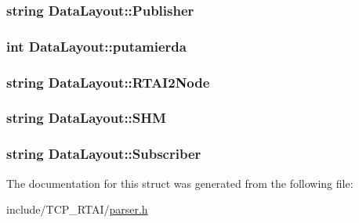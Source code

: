\label{structDataLayout_a53199b1a7dec9a22f699bb52c29ad6bf}
\hypertarget{structDataLayout_abaebb94f1869d06fb8f6ac20b6aa2a73}{
\subsubsection[{Publisher}]{\setlength{\rightskip}{0pt plus 5cm}string {\bf DataLayout::Publisher}}}
\label{structDataLayout_abaebb94f1869d06fb8f6ac20b6aa2a73}
\hypertarget{structDataLayout_aa1592c16757fab1045b59a6401cc5fc3}{
\subsubsection[{putamierda}]{\setlength{\rightskip}{0pt plus 5cm}int {\bf DataLayout::putamierda}}}
\label{structDataLayout_aa1592c16757fab1045b59a6401cc5fc3}
\hypertarget{structDataLayout_a7c8d32e6ccc22a6555aacd42c5d2038d}{
\subsubsection[{RTAI2Node}]{\setlength{\rightskip}{0pt plus 5cm}string {\bf DataLayout::RTAI2Node}}}
\label{structDataLayout_a7c8d32e6ccc22a6555aacd42c5d2038d}
\hypertarget{structDataLayout_a54625c36788a43db621a7c960cdb1eb0}{
\subsubsection[{SHM}]{\setlength{\rightskip}{0pt plus 5cm}string {\bf DataLayout::SHM}}}
\label{structDataLayout_a54625c36788a43db621a7c960cdb1eb0}
\hypertarget{structDataLayout_a8ef8c1f2118099756c0f3110b90af218}{
\subsubsection[{Subscriber}]{\setlength{\rightskip}{0pt plus 5cm}string {\bf DataLayout::Subscriber}}}
\label{structDataLayout_a8ef8c1f2118099756c0f3110b90af218}


The documentation for this struct was generated from the following file:\begin{DoxyCompactItemize}
\item 
include/TCP\_\-RTAI/\hyperlink{parser_8h}{parser.h}\end{DoxyCompactItemize}
